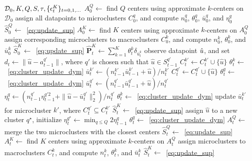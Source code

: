 \begin{algorithm}[ht]
\caption{OnlineClustering}\label{alg:online_cluster}
	\begin{algorithmic}[1]
	  $\mathcal{D}_0, K, Q, S,\tau, \{\epsilon^K_t\}_{t=0,1,\dots}$
     \State $A^Q_0 \gets$ find $Q$ centers using approximate $k$-centers on $\mathcal{D}_0$
     \State assign all datapoints to microclusters $C^q_0$, and compute $n^q_0$, $\theta^q_0$, $\bar{u}_0^q$, and $\eta^q_0$
     \State $\hat{S}^Q_{0} \gets $~\eqref{eq:update_sup}
     \State $A^K_0 \gets$ find $K$ centers using approximate $k$-centers on $A^Q_0$
     \State assign corresponding microclusters to macroclusters $C^k_0$, and compute $n^k_0$, $\theta^k_0$, and $\bar{u}_0^k$
     \State $\hat{S}^K_{0}\gets $~\eqref{eq:update_sup}
     \State  $\hat{\mathbf{P}}^K_{t} \gets \sum_{k=1}^{K}\theta_t^k\delta_{\bar{u}_t^k}$
    \State observe datapoint $\hat{u}$, and set $d_t \gets \|\hat{u} - a^{q'}_{t-1}\|$, where $q'$ is chosen such that $\hat{u} \in S^{q'}_{t-1}$
    \State $C_t^{k'} \gets C_t^{k'} \cup \{\hat{u}\}$ 
     \State $\theta^k_t\gets$~\eqref{eq:cluster_update_dym} 
    \State $\bar{u}^{k'}_t \gets (n^{k'}_{t-1}\bar{u}^{k'}_{t-1} + \hat{u})/n^{k'}_t$ 
    \State $C_t^{q'} \gets C_t^{q'} \cup \{\hat{u}\}$
    \State $\theta^q_t\gets$~\eqref{eq:cluster_update_dym} 
    \State $\bar{u}^{q'}_t \gets (n^{q'}_{t-1}\bar{u}^{q'}_{t-1} + \hat{u})/n^{q'}_t$
     \State $\eta^{q}_t \gets (n^{q'}_{t-1}\eta^{q'2}_{t-1} + \|\hat{u}-\bar{u}^{q'}_t\|_2^2 )/n^{q'}_t$
    \State $\theta^k_t\gets$~\eqref{eq:cluster_update_dym} 
    \State update $\bar{u}^{k'}_t$ for microcluster $k'$, where $C^{q'}_t \subseteq C^{k'}_t$
    \State $\hat{S}^K_{t}\gets $~\eqref{eq:update_sup}
    \Else
    \State assign $\hat{u}$ to a new cluster $q^\star$, initialize $\eta^{q^\star}_t \gets \min_{q\leq Q}2\eta^q_{t-1}$
    \State $\theta^q_t\gets$~\eqref{eq:cluster_update_dym} 
    \State $A^Q_t \gets$ merge the two microclusters with the closest centers 
    \State $\hat{S}^Q_{t}\gets $~\eqref{eq:update_sup}
   \State $A^K_t \gets$ find $K$ centers using approximate $k$-centers on $A^Q_t$
     \State assign microclusters to macroclusters $C^k_t$, and compute $n^k_t$, $\theta^k_t$, and $\bar{u}_t^k$
     \State $\hat{S}^K_{t}\gets $~\eqref{eq:update_sup}
    \EndIf
  \EndFor
	\end{algorithmic}
\end{algorithm}


